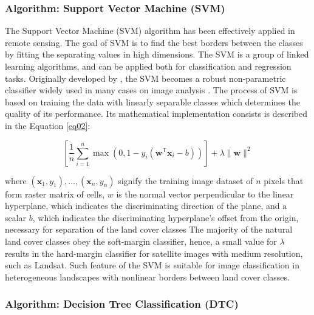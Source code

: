 \documentclass[sn-mathphys-num]{sn-jnl}%
\theoremstyle{thmstyleone}%
\theoremstyle{thmstyletwo}%
\theoremstyle{thmstylethree}%
\begin{document}
{ \subsubsection{Algorithm: Support Vector Machine (SVM)}
 
{The Support Vector Machine (SVM) algorithm has been effectively applied in remote sensing. The goal of SVM is to find the best borders between the classes by fitting the separating values in high dimensions. The SVM is a group of linked learning algorithms, and can be applied both for classification and regression tasks. Originally developed by} \cite{VapnikChervonenkis}, {the SVM becomes a robust non-parametric classifier widely used in many cases on image analysis} \cite{earth5030024,rs16122250,rs16122219}. {The process of SVM is based on training the data with linearly separable classes which determines the quality of its performance. Its mathematical implementation consists is described in the Equation} \ref{eq02}:

\begin{equation}\label{eq02}
	\left[{\frac {1}{n}}\sum _{i=1}^{n}\max \left(0,1-y_{i}(\mathbf {w} ^{\mathsf {T}}\mathbf {x} _{i}-b)\right)\right]+\lambda \|\mathbf {w} \|^{2}
\end{equation}
 
{where $(\mathbf {x} _{1},y_{1}),\ldots ,(\mathbf {x} _{n},y_{n})$ signify the training image dataset of $n$ pixels that form raster matrix of cells, ${w}$  is the normal vector perpendicular to the linear hyperplane, which indicates the discriminating direction of the plane, and a scalar $b$, which indicates the discriminating hyperplane's offset from the origin, necessary for separation of the land cover classes The majority of the natural land cover classes obey the soft-margin classifier, hence, a small value for $\lambda $ results in the hard-margin classifier for satellite images with medium resolution, such as Landsat. Such feature of the SVM is suitable for image classification in heterogeneous landscapes with nonlinear borders between land cover classes.}

\subsubsection{Algorithm: Decision Tree Classification (DTC)}}
  
\end{document}
